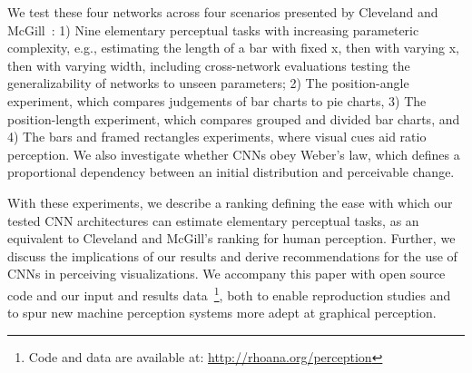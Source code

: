 We test these four networks across four scenarios presented by Cleveland and McGill~\cite{cleveland_mcgill}: 1) Nine elementary perceptual tasks with increasing parameteric complexity, e.g., estimating the length of a bar with fixed x, then with varying x, then with varying width, including cross-network evaluations testing the generalizability of networks to unseen parameters; 2) The position-angle experiment, which compares judgements of bar charts to pie charts, 3) The position-length experiment, which compares grouped and divided bar charts, and 4) The bars and framed rectangles experiments, where visual cues aid ratio perception. We also investigate whether CNNs obey Weber's law, which defines a proportional dependency between an initial distribution and perceivable change. 

With these experiments, we describe a ranking defining the ease with which our tested CNN architectures can estimate elementary perceptual tasks, as an equivalent to Cleveland and McGill's ranking for human perception. Further, we discuss the implications of our results and derive recommendations for the use of CNNs in perceiving visualizations. We accompany this paper with open source code and our input and results data~\footnote{Code and data are available at: \url{http://rhoana.org/perception}}, both to enable reproduction studies and to spur new machine perception systems more adept at graphical perception.




